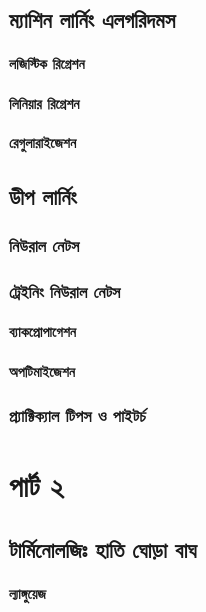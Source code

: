 \documentclass{book}
\begin{document}
\chapter{ম্যাশিন লার্নিং এলগরিদমস}

\subsection{লজিস্টিক রিগ্রেশন}
\subsection{লিনিয়ার রিগ্রেশন}
\subsection{রেগুলারাইজেশন}

\chapter{ডীপ লার্নিং}
\section{নিউরাল নেটস}
\section{ট্রেইনিং নিউরাল নেটস}
\subsection{ব্যাকপ্রোপাগেশন}
\subsection{অপটিমাইজেশন}
\section{প্র্যাক্টিক্যাল টিপস ও পাইটর্চ}


 \part{পার্ট ২} 
 
\chapter{টার্মিনোলজিঃ  হাতি ঘোড়া বাঘ}
\subsection{ল্যাঙ্গুয়েজ}
\end{document}

